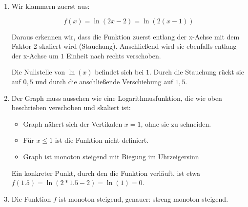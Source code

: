 \item

\begin{enumerate}

\item Wir klammern zuerst aus: 

$$f(x) = \ln(2x-2) = \ln(2(x-1))$$

Daraus erkennen wir, dass die Funktion zuerst entlang der x-Achse mit dem Faktor 2 skaliert wird (Stauchung). Anschließend wird sie ebenfalls entlang der x-Achse um $1$ Einheit nach rechts verschoben.

Die Nullstelle von $\ln(x)$ befindet sich bei $1$. Durch die Stauchung rückt sie auf $0{,}5$ und durch die anschließende Verschiebung auf $1{,}5$.

\item Der Graph muss aussehen wie eine Logarithmusfunktion, die wie oben beschrieben verschoben und skaliert ist:

\begin{itemize}
\item Graph nähert sich der Vertikalen $x=1$, ohne sie zu schneiden.
\item Für $x\le 1$ ist die Funktion nicht definiert.
\item Graph ist monoton steigend mit Biegung im Uhrzeigersinn
\end{itemize}

Ein konkreter Punkt, durch den die Funktion verläuft, ist etwa $f(1.5) = \ln(2*1.5-2) = \ln(1) = 0$.

\item Die Funktion $f$ ist monoton steigend, genauer: streng monoton steigend.

\end{enumerate}


